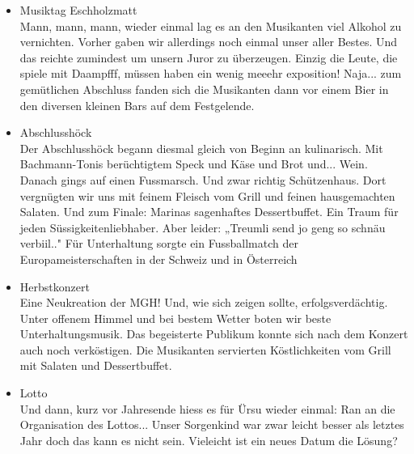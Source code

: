 \begin{history}
\begin{itemize}
        \item Musiktag Eschholzmatt\\
              Mann, mann, mann, wieder einmal lag es an den Musikanten viel Alkohol zu
              vernichten. Vorher gaben wir allerdings noch einmal unser aller Bestes.
              Und das reichte zumindest um unsern Juror zu überzeugen. Einzig die
              Leute, die spiele mit Daampfff, müssen haben ein wenig meeehr
              exposition! Naja... zum gemütlichen Abschluss fanden sich die Musikanten
              dann vor einem Bier in den diversen kleinen Bars auf dem Festgelende.

        \item Abschlusshöck\\
              Der Abschlusshöck begann diesmal gleich von Beginn an kulinarisch. Mit
              Bachmann-Tonis berüchtigtem Speck und Käse und Brot und... Wein. Danach
              gings auf einen Fussmarsch. Und zwar richtig Schützenhaus. Dort
              vergnügten wir uns mit feinem Fleisch vom Grill und feinen hausgemachten
              Salaten. Und zum Finale: Marinas sagenhaftes Dessertbuffet. Ein Traum
              für jeden Süssigkeitenliebhaber. Aber leider: „Treumli send jo geng so
              schnäu verbiil.." Für Unterhaltung sorgte ein Fussballmatch der
              Europameisterschaften in der Schweiz und in Österreich



        \item Herbstkonzert\\
              Eine Neukreation der MGH! Und, wie sich zeigen sollte,
              erfolgsverdächtig. Unter offenem Himmel und bei bestem Wetter boten wir
              beste Unterhaltungsmusik. Das begeisterte Publikum konnte sich nach dem
              Konzert auch noch verköstigen. Die Musikanten servierten Köstlichkeiten
              vom Grill mit Salaten und Dessertbuffet.

        \item Lotto\\
              Und dann, kurz vor Jahresende hiess es für Ürsu wieder einmal: Ran an
              die Organisation des Lottos... Unser Sorgenkind war zwar leicht besser
              als letztes Jahr doch das kann es nicht sein. Vieleicht ist ein neues
              Datum die Lösung?


    \end{itemize}

\end{history}
